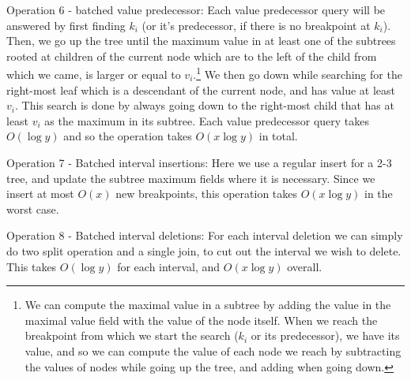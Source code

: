 \documentclass[11pt,a4paper]{article}
\theoremstyle{definition}
\theoremstyle{remark}
\begin{document}
Operation 6 - batched value predecessor: Each value predecessor query will be answered by first finding $k_i$ (or it's predecessor, if there is no breakpoint at $k_i$). Then, we go up the tree until the maximum value in at least one of the subtrees rooted at children of the current node which are to the left of the child from which we came, is larger or equal to $v_i$.\footnote{We can compute the maximal value in a subtree by adding the value in the maximal value field with the value of the node itself. When we reach the breakpoint from which we start the search ($k_i$ or its predecessor), we have its value, and so we can compute the value of each node we reach by subtracting the values of nodes while going up the tree, and adding when going down.} We then go down while searching for the right-most leaf which is a descendant of the current node, and has value at least $v_i$. This search is done by always going down to the right-most child that has at least $v_i$ as the maximum in its subtree. Each value predecessor query takes $O(\log y)$ and so the operation takes $O(x \log y)$ in total.

Operation 7 - Batched interval insertions: Here we use a regular insert for a 2-3 tree, and update the subtree maximum fields where it is necessary. Since we insert at most $O(x)$ new breakpoints, this operation takes $O(x \log y)$ in the worst case.

Operation 8 - Batched interval deletions: For each interval deletion we can simply do two split operation and a single join, to cut out the interval we wish to delete. This takes $O(\log y)$ for each interval, and $O(x \log y)$ overall.

\end{document}
